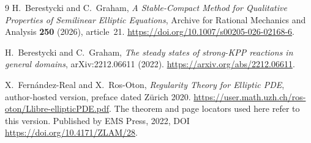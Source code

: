 \documentclass[11pt]{article}
\begin{document}
\begin{thebibliography}{9}
H.~Berestycki and C.~Graham,
\emph{A Stable-Compact Method for Qualitative Properties of Semilinear
Elliptic Equations},
Archive for Rational Mechanics and Analysis \textbf{250} (2026), article~21.
\url{https://doi.org/10.1007/s00205-026-02168-6}.

H.~Berestycki and C.~Graham,
\emph{The steady states of strong-KPP reactions in general domains},
arXiv:2212.06611 (2022).
\url{https://arxiv.org/abs/2212.06611}.

X.~Fern\'andez-Real and X.~Ros-Oton,
\emph{Regularity Theory for Elliptic PDE},
author-hosted version, preface dated Z\"urich 2020.
\url{https://user.math.uzh.ch/ros-oton/Llibre-ellipticPDE.pdf}.
The theorem and page locators used here refer to this version.
Published by EMS Press, 2022, DOI
\url{https://doi.org/10.4171/ZLAM/28}.
\end{thebibliography}
\end{document}
